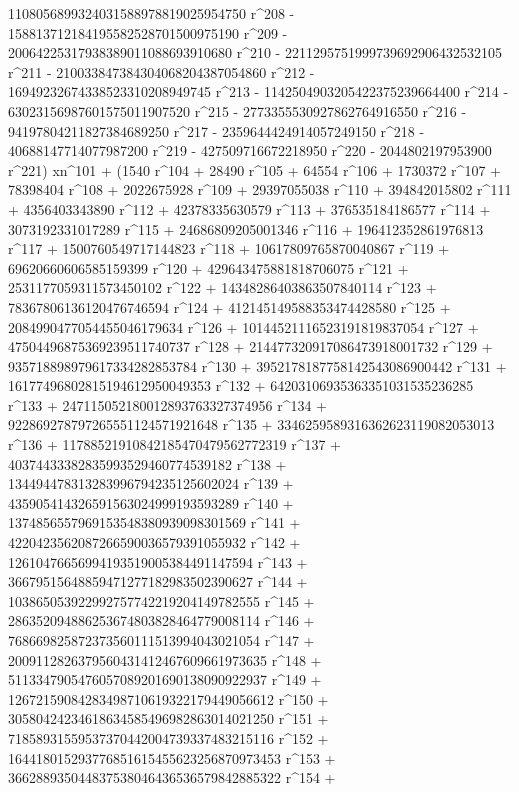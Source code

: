       1108056899324031588978819025954750 r^208 - 
       158813712184195582528701500975190 r^209 - 
       20064225317938389011088693910680 r^210 - 
       2211295751999739692906432532105 r^211 - 
       210033847384304068204387054860 r^212 - 
       16949232674338523310208949745 r^213 - 
       1142504903205422375239664400 r^214 - 
       63023156987601575011907520 r^215 - 
       2773355530927862764916550 r^216 - 
       94197804211827384689250 r^217 - 2359644424914057249150 r^218 - 
       40688147714077987200 r^219 - 427509716672218950 r^220 - 
       2044802197953900 r^221) xn^101 + (1540 r^104 + 28490 r^105 + 
       64554 r^106 + 1730372 r^107 + 78398404 r^108 + 
       2022675928 r^109 + 29397055038 r^110 + 394842015802 r^111 + 
       4356403343890 r^112 + 42378335630579 r^113 + 
       376535184186577 r^114 + 3073192331017289 r^115 + 
       24686809205001346 r^116 + 196412352861976813 r^117 + 
       1500760549717144823 r^118 + 10617809765870040867 r^119 + 
       69620660606585159399 r^120 + 429643475881818706075 r^121 + 
       2531177059311573450102 r^122 + 14348286403863507840114 r^123 + 
       78367806136120476746594 r^124 + 
       412145149588353474428580 r^125 + 
       2084990477054455046179634 r^126 + 
       10144521116523191819837054 r^127 + 
       47504496875369239511740737 r^128 + 
       214477320917086473918001732 r^129 + 
       935718898979617334282853784 r^130 + 
       3952178187758142543086900442 r^131 + 
       16177496802815194612950049353 r^132 + 
       64203106935363351031535236285 r^133 + 
       247115052180012893763327374956 r^134 + 
       922869278797265551124571921648 r^135 + 
       3346259589316362623119082053013 r^136 + 
       11788521910842185470479562772319 r^137 + 
       40374433382835993529460774539182 r^138 + 
       134494478313283996794235125602024 r^139 + 
       435905414326591563024999193593289 r^140 + 
       1374856557969153548380939098301569 r^141 + 
       4220423562087266590036579391055932 r^142 + 
       12610476656994193519005384491147594 r^143 + 
       36679515648859471277182983502390627 r^144 + 
       103865053922992757742219204149782555 r^145 + 
       286352094886253674803828464779008114 r^146 + 
       768669825872373560111513994043021054 r^147 + 
       2009112826379560431412467609661973635 r^148 + 
       5113347905476057089201690138090922937 r^149 + 
       12672159084283498710619322179449056612 r^150 + 
       30580424234618634585496982863014021250 r^151 + 
       71858931559537370442004739337483215116 r^152 + 
       164418015293776851615455623256870973453 r^153 + 
       366288935044837538046436536579842885322 r^154 + 

